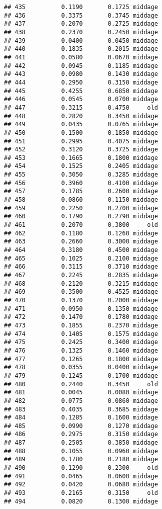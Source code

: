 \documentclass[
]{article}
\begin{document}
\begin{verbatim}
## 435          0.1190       0.1725 middage
## 436          0.3375       0.3745 middage
## 437          0.2070       0.2725 middage
## 438          0.2370       0.2450 middage
## 439          0.0400       0.0450 middage
## 440          0.1835       0.2015 middage
## 441          0.0580       0.0670 middage
## 442          0.0945       0.1185 middage
## 443          0.0980       0.1430 middage
## 444          0.2950       0.3150 middage
## 445          0.4255       0.6850 middage
## 446          0.0545       0.0700 middage
## 447          0.3215       0.4750     old
## 448          0.2820       0.3450 middage
## 449          0.0435       0.0765 middage
## 450          0.1500       0.1850 middage
## 451          0.2995       0.4075 middage
## 452          0.3120       0.3725 middage
## 453          0.1665       0.1800 middage
## 454          0.1525       0.2405 middage
## 455          0.3050       0.3285 middage
## 456          0.3960       0.4100 middage
## 457          0.1785       0.2600 middage
## 458          0.0860       0.1150 middage
## 459          0.2250       0.2700 middage
## 460          0.1790       0.2790 middage
## 461          0.2070       0.3800     old
## 462          0.1180       0.1260 middage
## 463          0.2660       0.3000 middage
## 464          0.3180       0.4500 middage
## 465          0.1025       0.2100 middage
## 466          0.3115       0.3710 middage
## 467          0.2245       0.2835 middage
## 468          0.2120       0.3215 middage
## 469          0.3500       0.4525 middage
## 470          0.1370       0.2000 middage
## 471          0.0950       0.1350 middage
## 472          0.1470       0.1780 middage
## 473          0.1855       0.2370 middage
## 474          0.1405       0.1575 middage
## 475          0.2425       0.3400 middage
## 476          0.1325       0.1460 middage
## 477          0.1265       0.1800 middage
## 478          0.0355       0.0400 middage
## 479          0.1245       0.1700 middage
## 480          0.2440       0.3450     old
## 481          0.0045       0.0080 middage
## 482          0.0775       0.0860 middage
## 483          0.4035       0.3685 middage
## 484          0.1285       0.1600 middage
## 485          0.0990       0.1270 middage
## 486          0.2975       0.3150 middage
## 487          0.2505       0.3850 middage
## 488          0.1055       0.0960 middage
## 489          0.1780       0.2180 middage
## 490          0.1290       0.2300     old
## 491          0.0465       0.0600 middage
## 492          0.0420       0.0680 middage
## 493          0.2165       0.3150     old
## 494          0.0820       0.1300 middage

\end{verbatim}
\end{document}
